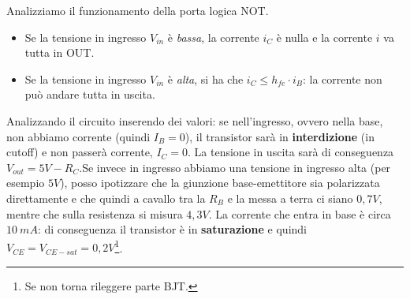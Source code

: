 \documentclass[
]{book}
\providecommand{\tightlist}{%
  \setlength{\itemsep}{0pt}\setlength{\parskip}{0pt}}
\begin{document}
Analizziamo il funzionamento della porta logica NOT.

\begin{itemize}
\tightlist
\item
  Se la tensione in ingresso \(V_{in}\) è \emph{bassa}, la corrente
  \(i_C\) è nulla e la corrente \(i\) va tutta in OUT.
\item
  Se la tensione in ingresso \(V_{in}\) è \emph{alta}, si ha che
  \(i_{C}\leq h_{fe}\cdot i_{B}\): la corrente non può andare tutta in
  uscita.
\end{itemize}

Analizzando il circuito inserendo dei valori: se nell'ingresso, ovvero
nella base, non abbiamo corrente (quindi \(I_{B}=0\)), il transistor
sarà in \textbf{interdizione} (in cutoff) e non passerà corrente,
\(I_{C}=0\). La tensione in uscita sarà di conseguenza
\(V_{out}=5V- R_{C}\).\newline Se invece in ingresso abbiamo una
tensione in ingresso alta (per esempio \(5V\)), posso ipotizzare che la
giunzione base-emettitore sia polarizzata direttamente e che quindi a
cavallo tra la \(R_B\) e la messa a terra ci siano \(0,7V\), mentre che
sulla resistenza si misura \(4,3V\). La corrente che entra in base è
circa \(10\:mA\): di conseguenza il transistor è in \textbf{saturazione}
e quindi \(V_{CE}=V_{CE-sat}=0,2V\)\footnote{Se non torna rileggere
  parte BJT.}.
\end{document}
